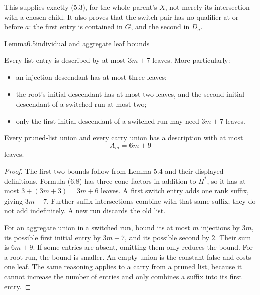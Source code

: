 This supplies exactly (5.3), for the whole parent's \(X\), not merely its intersection with a chosen child. It also proves that the switch pair has no qualifier at or before \(a\): the first entry is contained in \(G\), and the second in \(D_a\).

\begin{numbered}{Lemma}{6.5}{individual and aggregate leaf bounds}

Every list entry is described by at most \(3m+7\) leaves. More particularly:

\begin{itemize}
\tightlist
\item
  an injection descendant has at most three leaves;
\item
  the root's initial descendant has at most two leaves, and the second initial descendant of a switched run at most two;
\item
  only the first initial descendant of a switched run may need \(3m+7\) leaves.
\end{itemize}

Every pruned-list union and every carry union has a description with at most \[
A_m=6m+9
\tag{6.9}
\] leaves.

\end{numbered}

\begin{proof}
The first two bounds follow from Lemma 5.4 and their displayed definitions. Formula (6.8) has three cone factors in addition to \(H^*\), so it has at most \(3+(3m+3)=3m+6\) leaves. A first switch entry adds one rank suffix, giving \(3m+7\). Further suffix intersections combine with that same suffix; they do not add indefinitely. A new run discards the old list.

For an aggregate union in a switched run, bound its at most \(m\) injections by \(3m\), its possible first initial entry by \(3m+7\), and its possible second by \(2\). Their sum is \(6m+9\). If some entries are absent, omitting them only reduces the bound. For a root run, the bound is smaller. An empty union is the constant false and costs one leaf. The same reasoning applies to a carry from a pruned list, because it cannot increase the number of entries and only combines a suffix into its first entry.
\end{proof}

